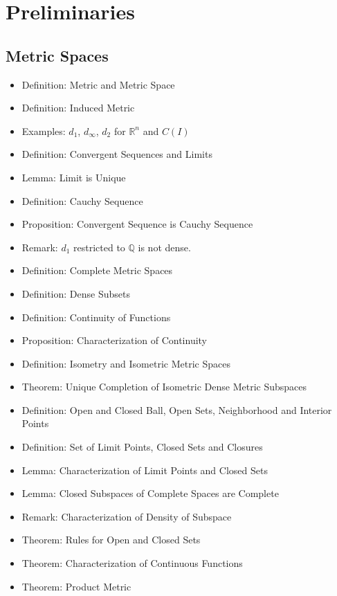 \documentclass[8pt,twocolumn]{article}
\begin{document}
  \section{Preliminaries} %
  \label{sec:preliminaries}
    \subsection{Metric Spaces} %
    \label{sub:metric_spaces}
      \begin{itemize}
        \item Definition: Metric and Metric Space
        \item Definition: Induced Metric
        \item Examples: $d_1$, $d_\infty$, $d_2$ for $\mathds{R}^n$ and $C(I)$
        \item Definition: Convergent Sequences and Limits
        \item Lemma: Limit is Unique
        \item Definition: Cauchy Sequence
        \item Proposition: Convergent Sequence is Cauchy Sequence
        \item Remark: $d_1$ restricted to $\mathds{Q}$ is not dense.
        \item Definition: Complete Metric Spaces
        \item Definition: Dense Subsets
        \item Definition: Continuity of Functions
        \item Proposition: Characterization of Continuity
        \item Definition: Isometry and Isometric Metric Spaces
        \item Theorem: Unique Completion of Isometric Dense Metric Subspaces
        \item Definition: Open and Closed Ball, Open Sets, Neighborhood and Interior Points
        \item Definition: Set of Limit Points, Closed Sets and Closures
        \item Lemma: Characterization of Limit Points and Closed Sets
        \item Lemma: Closed Subspaces of Complete Spaces are Complete
        \item Remark: Characterization of Density of Subspace
        \item Theorem: Rules for Open and Closed Sets
        \item Theorem: Characterization of Continuous Functions
        \item Theorem: Product Metric
      \end{itemize}
\end{document}
